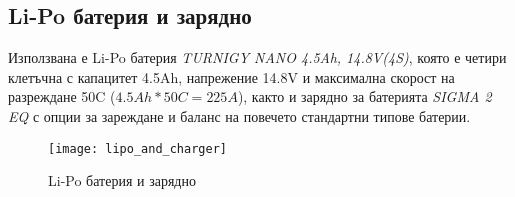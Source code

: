 \subsection{Li-Po батерия и зарядно}

Използвана е Li-Po батерия  \textit{TURNIGY NANO 4.5Ah, 14.8V(4S)}, която е четири клетъчна с капацитет 4.5Ah,
напрежение 14.8V и максимална скорост на разреждане 50C (\(4.5Ah*50C=225A\)),
както и зарядно за батерията \textit{SIGMA 2 EQ} с опции за зареждане и баланс на повечето стандартни типове батерии.

\begin{figure}[htpb!]
    \centering
    \texttt{[image: lipo\_and\_charger]}
    \caption{Li-Po батерия и зарядно}
    \label{fig:lipo_and_charger}
\end{figure}

\FloatBarrier
